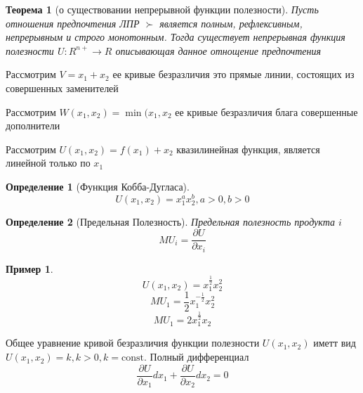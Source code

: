 \documentclass[14pt]{extarticle}
\newtheorem{theorem}{Теорема}
\newtheorem{definition}{Определение}
\newtheorem{example}{Пример}
\begin{document}
	\begin{theorem}[о существовании непрерывной функции полезности]
	Пусть отношения предпочтения ЛПР $\succ$
	является полным, рефлексивным, непрерывным и строго монотонным.
	Тогда существует непрерывная функция полезности  $U:R^{n+} \to R$ описывающая данное отнощение предпочтения
	\end{theorem}
	Рассмотрим $V = x_1 + x_2$ ее кривые безразличия это
	прямые линии, состоящих из совершенных заменителей

	Рассмотрим $W(x_1,x_2) = \min(x_1,x_2$ ее кривые безразличия
 блага совершенные дополнители


Рассмотрим $U(x_1,x_2) = f(x_1) + x_2$ квазилинейная функция, является линейной только по $x_1$
\begin{definition}[Функция Кобба-Дугласа]
	\begin{equation}
		U(x_1,x_2) = x_1^{a} x_2^{b}, a>0,b>0
	\end{equation}
\end{definition}
\begin{definition}[Предельная Полезность]
	Предельная полезность продукта $i$
	\begin{equation}
		MU_{i} = \frac{\partial U}{\partial x_{i}}
	\end{equation} 
\end{definition}
\begin{example}
	\begin{equation}
	U(x_1,x_2) = x_1^{\frac{1}{2}}x^2_2
	\end{equation} 
	\begin{equation}
	MU_1 = \frac{1}{2} x_1 ^{- \frac{1}{2}}x^2_{2}
	\end{equation} 
	\begin{equation}
	MU_1 = 2 x_1^{\frac{1}{2}} x_2
	\end{equation} 
\end{example}
Общее уравнение кривой безразличия функции 
полезности $U(x_1,x_2)$ иметт вид $U(x_1,x_2) = k, k > 0 , k = \text{const}$. Полный дифференциал
\begin{equation}
\frac{\partial U}{\partial x_{1}} dx_1 + \frac{\partial U}{\partial x_2} dx_2 = 0
\end{equation} 
\end{document}
